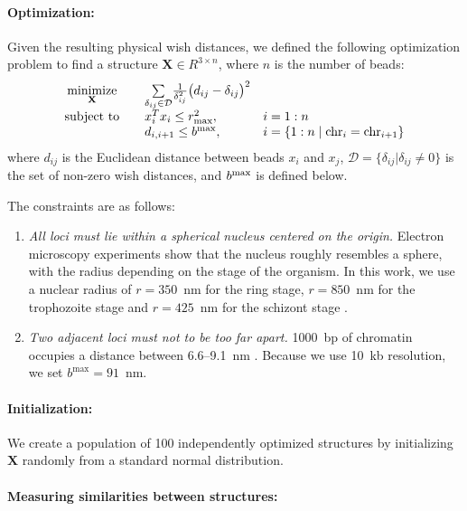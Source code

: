 \paragraph{Optimization: } Given the resulting physical wish distances, we
defined the following optimization problem to find a structure $\mathbf{X}
\in R^{3 \times n}$, where $n$ is the number of beads:
\begin{equation*}
\begin{array}{ccll}
\underset{\mathbf{X}}{\text{minimize}} & &
\underset{\delta_{ij} \in \mathcal{D}}{\sum} \frac{1}{\delta_{ij}^2}\big(d_{ij} - \delta_{ij}\big)^2 &\\
\text{subject to}
& & x_i^Tx_i \leq r_{\rm max}^2, \quad
& i = 1:n\\
& & d_{i, i+1} \leq b^{\rm max} , \quad
& i = \{1:n \;|\; {\rm chr}_i = {\rm chr}_{i+1}\}\\
\end{array}
\end{equation*}
where $d_{ij}$ is the Euclidean distance between beads $x_i$ and
$x_j$, $\mathcal{D} = \{ \delta_{ij} | \delta_{ij} \neq 0\}$ is
the set of non-zero wish distances, and $b^{\rm max}$ is defined below.

The constraints are as follows:
\begin{enumerate}
\item \emph{All loci must lie within a spherical nucleus centered on the origin. }
  Electron microscopy experiments show that the nucleus roughly resembles a
  sphere, with the radius depending on the stage of the organism.  In
  this work, we use a nuclear radius of $r = 350$~nm for the ring
  stage, $r=850$~nm for the trophozoite stage and $r=425$~nm for the
  schizont stage \citep{bannister:making, weiner:3d}.
\item \emph{Two adjacent loci must not to be too far apart.}
  1000~bp of chromatin occupies a distance between 6.6--9.1~nm
  \citep{berger:high}. Because we use 10~kb resolution, we set $b^\text{max} = 91$~nm.
\end{enumerate}

\paragraph{Initialization:}
We create a population of 100 independently optimized structures by initializing
$\textbf{X}$ randomly from a standard normal distribution.

\paragraph{Measuring similarities between structures:}

